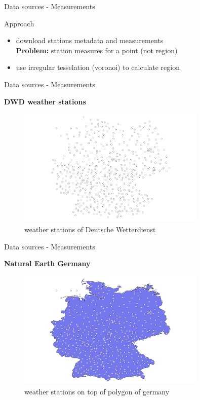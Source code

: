 \documentclass[ucs,9pt]{beamer}
\newcommand\headline[1]{%
  \par\bigskip
  {\Large\bfseries#1}\par\smallskip}
\begin{document}
\begin{frame}{Data sources - Measurements}
  \begin{block}{Approach}
    \begin{itemize}
        \item download stations metadata and measurements \\
          \vspace{0.1cm}
          \textbf{Problem:} station measures for a point (not region)
        \item use irregular tesselation (voronoi) to calculate region
    \end{itemize}
  \end{block}
\end{frame}

\begin{frame}{Data sources - Measurements}
  \headline{DWD weather stations}
  \begin{figure}
    \centering
    \includegraphics[width=0.8\textwidth]{images/stations.png}
    \caption{weather stations of Deutsche Wetterdienst}
    \label{fig:stations}
  \end{figure}
\end{frame}

\begin{frame}{Data sources - Measurements}
  \headline{Natural Earth \small{Germany}}
  \begin{figure}
    \centering
    \includegraphics[width=0.8\textwidth]{images/stations_in_germany.png}
    \caption{weather stations on top of polygon of germany}
    \label{fig:germany}
  \end{figure}
\end{frame}
\end{document}
